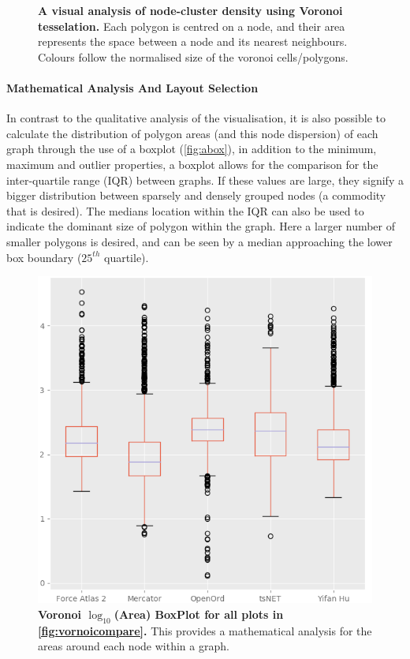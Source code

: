 \begin{figure}[H]
        \caption{\textbf{A visual analysis of node-cluster density using Voronoi tesselation.} Each polygon is centred on a node, and their area represents the space between a node and its nearest neighbours. Colours follow the normalised size of the voronoi cells/polygons.}
        \label{fig:vornoicompare}
\end{figure}



\paragraph*{Mathematical Analysis And Layout Selection}
In contrast to the qualitative analysis of the visualisation, it is also possible to calculate the distribution of polygon areas (and this node dispersion) of each graph through the use of a boxplot (\autoref{fig:abox}), in addition to the minimum, maximum and outlier properties, a boxplot allows for the comparison for the inter-quartile range (IQR) between graphs. If these values are large, they signify a bigger distribution between sparsely and densely grouped nodes (a commodity that is desired). The medians location within the IQR can also be used to indicate the dominant size of polygon within the graph. Here a larger number of smaller polygons is desired, and can be seen by a median approaching the lower box boundary ($25^{th}$ quartile).

\begin{figure}[H]
\centering \includegraphics[width=.6\textwidth]{figures_c1/area/log10layoutbox.png}
\caption{\textbf{Voronoi $\log_{10}$(Area) BoxPlot for all plots in \autoref{fig:vornoicompare}.} This provides a mathematical analysis for the areas around each node within a graph. }
\label{fig:abox}
\end{figure}

